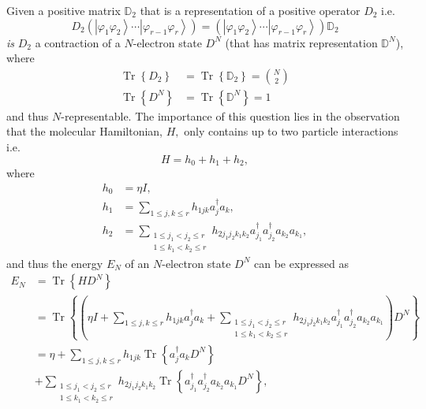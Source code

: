 \documentclass[aps,preprint]{revtex4}%
\begin{document}
Given a positive matrix $\mathbb{D}_{2}$ that is a representation of a
positive operator $D_{2}$ i.e.
\begin{equation}
D_{2}\left(  \left\vert \varphi_{1}\varphi_{2}\right\rangle \cdots\left\vert
\varphi_{r-1}\varphi_{r}\right\rangle \right)  =\left(  \left\vert \varphi
_{1}\varphi_{2}\right\rangle \cdots\left\vert \varphi_{r-1}\varphi
_{r}\right\rangle \right)  \mathbb{D}_{2}%
\end{equation}
\emph{is} $D_{2}$ a contraction of a $N$-electron state $D^{N}$ (that has
matrix representation $\mathbb{D}^{N}$), where
\begin{align}
\operatorname{Tr}\left\{  D_{2}\right\}   &  =\operatorname{Tr}\left\{
\mathbb{D}_{2}\right\}  =\binom{N}{2}\\
\operatorname{Tr}\left\{  D^{N}\right\}   &  =\operatorname{Tr}\left\{
\mathbb{D}^{N}\right\}  =1
\end{align}
and thus $N$-representable. The importance of this question lies in the
observation that the molecular Hamiltonian, $H,$ only contains up to two
particle interactions i.e.
\begin{equation}
H=h_{0}+h_{1}+h_{2},
\end{equation}
where%
\begin{align}
h_{0}  &  =\eta I,\\
h_{1}  &  =\sum_{1\leq j,k\leq r}h_{1jk}a_{j}^{\dagger}a_{k},\\
h_{2}  &  =\sum_{\substack{1\leq j_{1}<j_{2}\leq r\\1\leq k_{1}<k_{2}\leq
r}}h_{2j_{1}j_{2}k_{1}k_{2}}a_{j_{1}}^{\dagger}a_{j_{2}}^{\dagger}a_{k_{2}%
}a_{k_{1}},
\end{align}
and thus the energy $E_{N}$ of an $N$-electron state $D^{N}$ can be expressed
as
\begin{align}
E_{N}  &  =\operatorname{Tr}\left\{  HD^{N}\right\} \nonumber\\
&  =\operatorname{Tr}\left\{  \left(  \eta I+\sum_{1\leq j,k\leq r}%
h_{1jk}a_{j}^{\dagger}a_{k}+\sum_{\substack{1\leq j_{1}<j_{2}\leq r\\1\leq
k_{1}<k_{2}\leq r}}h_{2j_{1}j_{2}k_{1}k_{2}}a_{j_{1}}^{\dagger}a_{j_{2}%
}^{\dagger}a_{k_{2}}a_{k_{1}}\right)  D^{N}\right\} \nonumber\\
&  =\eta+\sum_{1\leq j,k\leq r}h_{1jk}\operatorname{Tr}\left\{  a_{j}%
^{\dagger}a_{k}D^{N}\right\} \nonumber\\
&  +\sum_{\substack{1\leq j_{1}<j_{2}\leq r\\1\leq k_{1}<k_{2}\leq
r}}h_{2j_{1}j_{2}k_{1}k_{2}}\operatorname{Tr}\left\{  a_{j_{1}}^{\dagger
}a_{j_{2}}^{\dagger}a_{k_{2}}a_{k_{1}}D^{N}\right\}  ,
\end{align}
\end{document}
